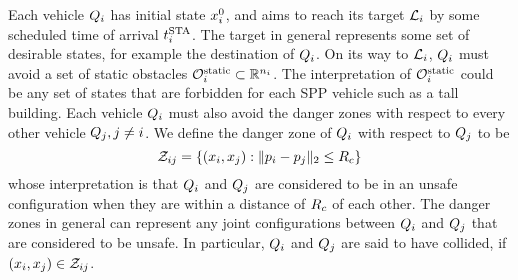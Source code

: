 

Each vehicle $Q_i$ has initial state $x^0_i$, and aims to reach its target $\mathcal{L}_i$ by some scheduled time of arrival $t^\text{STA}_i$.  The target in general represents some set of desirable states, for example the destination of $Q_i$. %
On its way to $\mathcal{L}_i$, $Q_i$ must avoid a set of static obstacles $\mathcal{O}^\text{static}_i \subset \mathbb{R}^{n_i}$. The interpretation of $\mathcal{O}^\text{static}_i$ could be any set of states that are forbidden for each SPP vehicle such as a tall building. Each vehicle $Q_i$ must also avoid the danger zones with respect to every other vehicle $Q_j, j\neq i$. We define the danger zone of $Q_i$ with respect to $Q_j$ to be
\begin{equation} \label{eqn:danger_zone_defn}
\dz_{ij} = \{(\state_i, \state_j): \|\pos_i - \pos_j\|_2 \le \rc\}
\end{equation}
\noindent whose interpretation is that $Q_i$ and $Q_j$ are considered to be in an unsafe configuration when they are within a distance of $R_c$ of each other. The danger zones in general can represent any joint configurations between $Q_i$ and $Q_j$ that are considered to be unsafe. In particular, $Q_i$ and $Q_j$ are said to have collided, if $(x_i, x_j) \in \mathcal{Z}_{ij}$.


